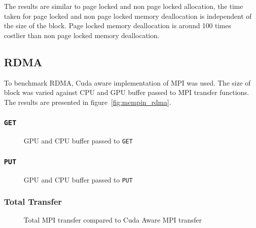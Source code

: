 The results are similar to page locked and non page locked allocation, the time
taken for page locked and non page locked memory deallocation is independent of
the size of the block. Page locked memory deallocation is around 100 times costlier
than non page locked memory deallocation.

\subsection{RDMA}
To benchmark RDMA, Cuda aware implementation of MPI was used. The size of block
was varied against CPU and GPU buffer passed to MPI transfer functions. The results
are presented in figure~\ref{fig:mempin_rdma}.

\subsubsection{\texttt{GET}}
\begin{figure}[h]
  
  \caption{GPU and CPU buffer passed to \texttt{GET}}
  \label{fig:mempin_rdma_get}
\end{figure}

\subsubsection{\texttt{PUT}}
\begin{figure}[h]
  
  \caption{GPU and CPU buffer passed to \texttt{PUT}}
  \label{fig:mempin_rdma_put}
\end{figure}

\subsubsection{Total Transfer}
\begin{figure}[h]
  
  \caption{Total MPI transfer compared to Cuda Aware MPI transfer}
  \label{fig:mempin_rdma_total}
\end{figure}
